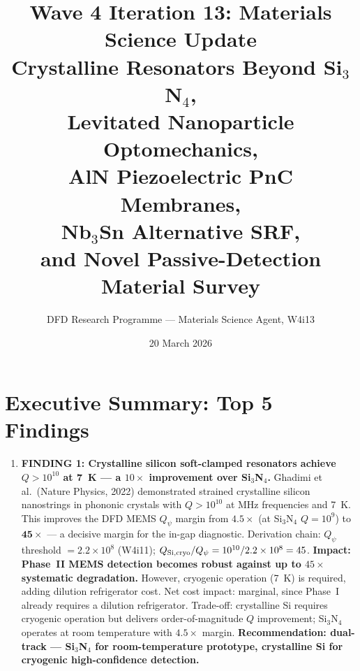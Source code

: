 \documentclass[11pt]{article}
\title{Wave 4 Iteration 13: Materials Science Update\\
\large Crystalline Resonators Beyond Si$_3$N$_4$,\\
Levitated Nanoparticle Optomechanics,\\
AlN Piezoelectric PnC Membranes,\\
Nb$_3$Sn Alternative SRF,\\
and Novel Passive-Detection Material Survey}
\author{DFD Research Programme --- Materials Science Agent, W4i13}
\date{20 March 2026}
\theoremstyle{definition}
\theoremstyle{remark}
\newcommand{\ee}[1]{\times 10^{#1}}
\newcommand{\Qpsi}{Q_\psi}
\begin{document}
\maketitle
\tableofcontents
\newpage

\section{Executive Summary: Top 5 Findings}
\label{sec:top5}

\begin{tcolorbox}[colback=blue!5!white, colframe=blue!50!black,
  title=\textbf{W4i13 TOP 5 FINDINGS --- Ranked by Programme Impact}]
\begin{enumerate}

\item \textbf{FINDING 1: Crystalline silicon soft-clamped resonators achieve
$Q > 10^{10}$ at 7~K --- a $10\times$ improvement over Si$_3$N$_4$.}
Ghadimi et al.\ (Nature Physics, 2022) demonstrated strained crystalline
silicon nanostrings in phononic crystals with $Q > 10^{10}$ at MHz
frequencies and 7~K. This improves the DFD MEMS $\Qpsi$ margin from
$4.5\times$ (at Si$_3$N$_4$ $Q = 10^9$) to $\mathbf{45\times}$ ---
a decisive margin for the in-gap diagnostic. Derivation chain:
$\Qpsi$ threshold $= 2.2\ee{8}$ (W4i11);
$Q_{\rm Si,cryo}/\Qpsi = 10^{10}/2.2\ee{8} = 45$.
\textbf{Impact: Phase~II MEMS detection becomes robust against
up to $45\times$ systematic degradation.} However, cryogenic operation
(7~K) is required, adding dilution refrigerator cost. Net cost impact:
marginal, since Phase~I already requires a dilution refrigerator.
Trade-off: crystalline Si requires cryogenic operation but delivers
order-of-magnitude $Q$ improvement; Si$_3$N$_4$ operates at room
temperature with $4.5\times$ margin. \textbf{Recommendation: dual-track ---
Si$_3$N$_4$ for room-temperature prototype, crystalline Si for cryogenic
high-confidence detection.}


\end{enumerate}
\end{tcolorbox}
\end{document}
